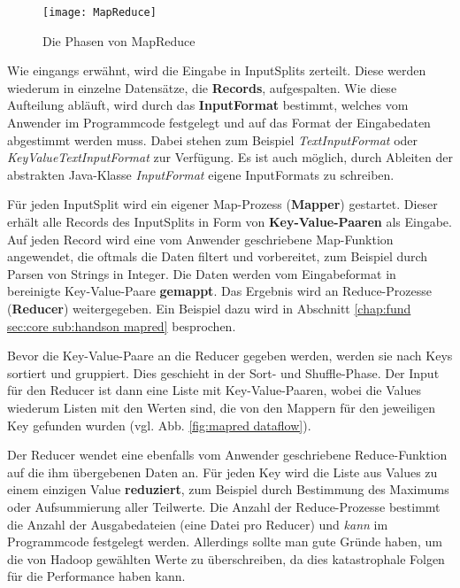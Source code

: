 \begin{figure}[ht]
    \centering
    \texttt{[image: MapReduce]}
    \caption[Die Phasen von MapReduce]{Die Phasen von MapReduce\parencite[Seite 34, Figure 2-4]{white_hadoop_2015}}
    \label{fig:mapred}
\end{figure}
Wie eingangs erwähnt, wird die Eingabe in InputSplits zerteilt. Diese werden wiederum in einzelne Datensätze, die \textbf{Records}, aufgespalten. Wie diese Aufteilung abläuft, wird durch das \textbf{InputFormat} bestimmt, welches vom Anwender im Programmcode festgelegt und auf das Format der Eingabedaten abgestimmt werden muss. Dabei stehen zum Beispiel \textit{TextInputFormat} oder \textit{KeyValueTextInputFormat} zur Verfügung. Es ist auch möglich, durch Ableiten der abstrakten Java-Klasse \textit{InputFormat} eigene InputFormats zu schreiben.\cite{white_hadoop_2015}
\par
Für jeden InputSplit wird ein eigener Map-Prozess (\textbf{Mapper}) gestartet. Dieser erhält alle Records des InputSplits in Form von \textbf{Key-Value-Paaren} als Eingabe. Auf jeden Record wird eine vom Anwender geschriebene Map-Funktion angewendet, die oftmals die Daten filtert und vorbereitet, zum Beispiel durch Parsen von Strings in Integer. Die Daten werden vom Eingabeformat in bereinigte Key-Value-Paare \textbf{gemappt}. Das Ergebnis wird an Reduce-Prozesse (\textbf{Reducer}) weitergegeben. Ein Beispiel dazu wird in Abschnitt \ref{chap:fund sec:core sub:handson mapred} besprochen.
\par
Bevor die Key-Value-Paare an die Reducer gegeben werden, werden sie nach Keys sortiert und gruppiert. Dies geschieht in der Sort- und Shuffle-Phase. Der Input für den Reducer ist dann eine Liste mit Key-Value-Paaren, wobei die Values wiederum Listen mit den Werten sind, die von den Mappern für den jeweiligen Key gefunden wurden (vgl. Abb. \ref{fig:mapred dataflow}). 
\par
Der Reducer wendet eine ebenfalls vom Anwender geschriebene Reduce-Funktion auf die ihm übergebenen Daten an. Für jeden Key wird die Liste aus Values zu einem einzigen Value \textbf{reduziert}, zum Beispiel durch Bestimmung des Maximums oder Aufsummierung aller Teilwerte. Die Anzahl der Reduce-Prozesse bestimmt die Anzahl der Ausgabedateien (eine Datei pro Reducer) und \textit{kann} im Programmcode festgelegt werden. Allerdings sollte man gute Gründe haben, um die von Hadoop gewählten Werte zu überschreiben, da dies katastrophale Folgen für die Performance haben kann.\cite{infrabot_howmanymapsandreduces_2019} 

